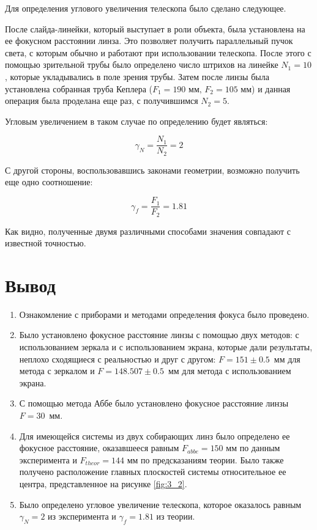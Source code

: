 \documentclass[a4paper, 12pt]{article}
\begin{document}
Для определения углового увеличения телескопа было сделано следующее.

После слайда-линейки, который выступает в роли объекта, была установлена на ее фокусном расстоянии линза. Это позволяет получить параллельный пучок света, с которым обычно и работают при использовании телескопа. После этого с помощью зрительной трубы было определено число штрихов на линейке $N_1 = 10$, которые укладывались в поле зрения трубы. Затем после линзы была установлена собранная труба Кеплера ($F_1 = 190 \text{ мм, } F_2 = 105 \text{ мм}$) и данная операция была проделана еще раз, с получившимся $N_2 = 5$.

Угловым увеличением в таком случае по определению будет являться:

\begin{equation}
	\boxed{
	\gamma_N = \frac{N_1}{N_2} = 2}
\end{equation}

С другой стороны, воспользовавшись законами геометрии, возможно получить еще одно соотношение:

\begin{equation*}
	\gamma_f = \frac{F_1}{F_2} = 1.81
\end{equation*}

Как видно, полученные двумя различными способами значения совпадают с известной точностью.

\section{Вывод}

\begin{enumerate}
	\item Ознакомление с приборами и методами определения фокуса было проведено.
	
	\item Было установлено фокусное расстояние линзы с помощью двух методов: с использованием зеркала и с использованием экрана, которые дали результаты, неплохо сходящиеся с реальностью и друг с другом: $F = 151\pm 0.5$~мм для метода с зеркалом и $F = 148.507 \pm 0.5$~мм для метода с использованием экрана. %
	
	\item С помощью метода Аббе было установлено фокусное расстояние линзы $F = 30$~мм. %
	
	\item  Для имеющейся системы из двух собирающих линз было определено ее фокусное расстояние, оказавшееся равным $F_{abbe} = 150 \text{ мм}$ по данным эксперимента и $F_{theor} = 144 \text{ мм}$ по предсказаниям теории. Было также получено расположение главных плоскостей системы относительное ее центра, представленное на рисунке \ref{fig:3_2}. %
	
	\item Было определено угловое увеличение телескопа, которое оказалось равным $\gamma_N = 2$ из эксперимента и $\gamma_f = 1.81$ из теории. 
\end{enumerate}
\end{document}
